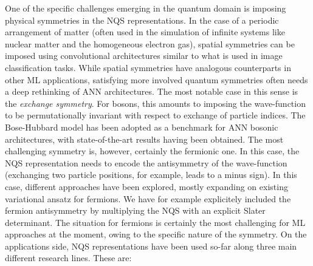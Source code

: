 \documentclass[aip,jcp,reprint,floatfix]{revtex4-1}
\begin{document}
One of the specific challenges emerging in the quantum domain is
imposing physical symmetries in the NQS representations. In the case
of a periodic arrangement of matter (often used in the simulation of
infinite systems like nuclear matter and the homogeneous electron
gas), spatial symmetries can be imposed using convolutional
architectures similar to what is used in image classification tasks.
While spatial symmetries have analogous counterparts in other ML
applications, satisfying more involved quantum symmetries often needs
a deep rethinking of ANN architectures.  The most notable case in this
sense is the \emph{exchange symmetry}.  For bosons, this amounts to
imposing the wave-function to be permutationally invariant with
respect to exchange of particle indices. The Bose-Hubbard model has
been adopted as a benchmark for ANN bosonic architectures, with
state-of-the-art results having been obtained.  The most challenging
symmetry is, however, certainly the fermionic one.  In this case, the
NQS representation needs to encode the antisymmetry of the
wave-function (exchanging two particle positions, for example, leads
to a minus sign). In this case, different approaches have been
explored, mostly expanding on existing variational ansatz for
fermions. We have for example explicitely included the fermion
antisymmetry by multiplying the NQS with an explicit Slater
determinant.  The situation for fermions is certainly the most
challenging for ML approaches at the moment, owing to the specific
nature of the symmetry.  On the applications side, NQS representations
have been used so-far along three main different research lines. These
are:
\end{document}
